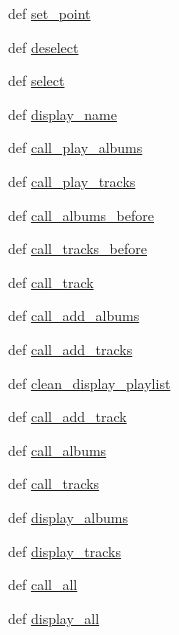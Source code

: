 \begin{DoxyCompactItemize}
def \hyperlink{classrunIG_1_1MyForm_aba398f9c55394b70eee08efd8965e1bb}{set\_\-point}
\item 
def \hyperlink{classrunIG_1_1MyForm_ae4902b4bffcb268da50439816ea3bc06}{deselect}
\item 
def \hyperlink{classrunIG_1_1MyForm_a47180231ce82b49171bba59a5948e362}{select}
\item 
def \hyperlink{classrunIG_1_1MyForm_ab7acbbb3f0e73fa29a0d595c759b26a5}{display\_\-name}
\item 
def \hyperlink{classrunIG_1_1MyForm_a7b42fac7d0518f4a863d0f9dafc4bbe9}{call\_\-play\_\-albums}
\item 
def \hyperlink{classrunIG_1_1MyForm_a1ad192d01600ab80f2421de462d1f90c}{call\_\-play\_\-tracks}
\item 
def \hyperlink{classrunIG_1_1MyForm_a99d5dcc8f786a9aed8e9c2e18d4747f1}{call\_\-albums\_\-before}
\item 
def \hyperlink{classrunIG_1_1MyForm_aefa9beaae07b13b24a1f0a695bff9746}{call\_\-tracks\_\-before}
\item 
def \hyperlink{classrunIG_1_1MyForm_a94d3ea7f5a6badc072a7dbf1575feb0f}{call\_\-track}
\item 
def \hyperlink{classrunIG_1_1MyForm_ae29f5ab02053aa73ada18294b182830b}{call\_\-add\_\-albums}
\item 
def \hyperlink{classrunIG_1_1MyForm_aa47e735be952935969e89b4c8b077e55}{call\_\-add\_\-tracks}
\item 
def \hyperlink{classrunIG_1_1MyForm_a6c1434b1522094e07a5b1439a82550cd}{clean\_\-display\_\-playlist}
\item 
def \hyperlink{classrunIG_1_1MyForm_a37e3411cf8aff4275cd2b6a139797666}{call\_\-add\_\-track}
\item 
def \hyperlink{classrunIG_1_1MyForm_acced0ef6117302517a94ec72c78c57a9}{call\_\-albums}
\item 
def \hyperlink{classrunIG_1_1MyForm_a2df76c12300fff05b6803dc72a085979}{call\_\-tracks}
\item 
def \hyperlink{classrunIG_1_1MyForm_af990dabf517b0670de78e417ff69bbe9}{display\_\-albums}
\item 
def \hyperlink{classrunIG_1_1MyForm_a7f0500bfc7e4fd68dc4cb0aa0c62d245}{display\_\-tracks}
\item 
def \hyperlink{classrunIG_1_1MyForm_a76fc4b0942df6bbaf9a6fb746d419308}{call\_\-all}
\item 
def \hyperlink{classrunIG_1_1MyForm_a27a542b6447595698f5b5f5b9a7da992}{display\_\-all}
\item 

\end{DoxyCompactItemize}
